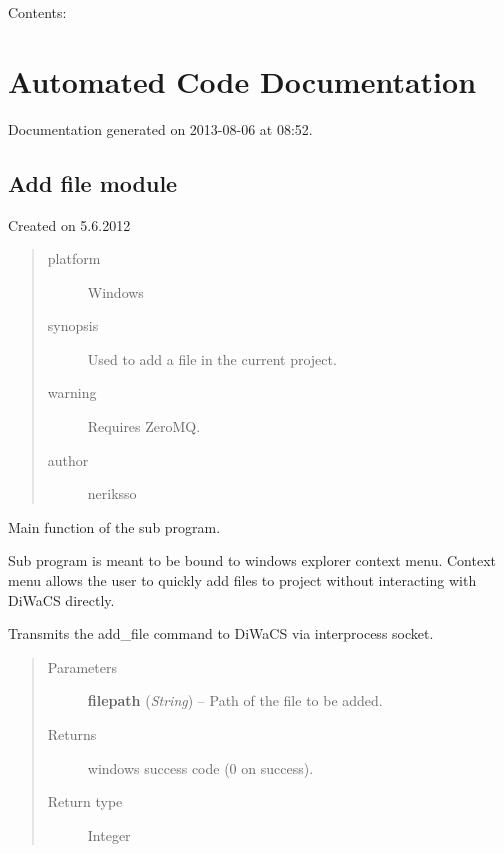 \documentclass[letterpaper,10pt,english]{sphinxmanual}
\begin{document}
Contents:


\chapter{Automated Code Documentation}
\label{api:automated-code-documentation}\label{api::doc}\label{api:welcome-to-diwacs-documentation}
Documentation generated on 2013-08-06 at 08:52.


\section{Add file module}
\label{add_file:module-add_file}\label{add_file:add-file-module}\label{add_file::doc}
Created on 5.6.2012
\begin{quote}\begin{description}
\item[{platform}] \leavevmode
Windows

\item[{synopsis}] \leavevmode
Used to add a file in the current project.

\item[{warning}] \leavevmode
Requires ZeroMQ.

\item[{author}] \leavevmode
neriksso

\end{description}\end{quote}

\begin{fulllineitems}
\label{add_file:add_file.main}
Main function of the sub program.

Sub program is meant to be bound to windows explorer context menu.
Context menu allows the user to quickly add files to project without
interacting with DiWaCS directly.

Transmits the add\_file command to DiWaCS via interprocess socket.
\begin{quote}\begin{description}
\item[{Parameters}] \leavevmode
\textbf{filepath} (\emph{String}) -- Path of the file to be added.

\item[{Returns}] \leavevmode
windows success code (0 on success).

\item[{Return type}] \leavevmode
Integer

\end{description}\end{quote}

\end{fulllineitems}
\end{document}
